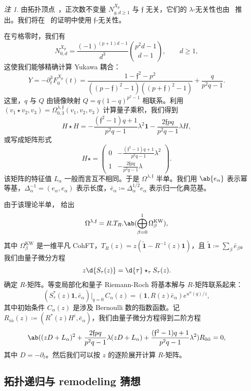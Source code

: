 \documentclass{amsart}
\theoremstyle{definition}
\theoremstyle{remark}
\newtheorem{rmk}[thm]{注}
\theoremstyle{plain}
\theoremstyle{definition}
\theoremstyle{remark}
\newcommand{\mf}[1]{\mathfrak{#1}}
\newcommand{\mr}[1]{\mathrm{#1}}
\newcommand{\wt}[1]{\widetilde{#1}}
\newcommand{\1}{\mathbf{1}}
\newcommand{\2}{\mathbf{2}}
\newcommand{\3}{\mathbf{3}}
\begin{document}
\begin{rmk}
    由拓扑顶点~\cite{LLLZ2009}，正次数不变量 \(N^{X_p}_{g,d\geq1}\) 与 \(\mf{f}\) 无关，它们的 \(\lambda\)-无关性也由~ 推出。我们将在~ 的证明中使用 \(\mf{f}\)-无关性。
\end{rmk}

在亏格零时，我们有
\[ N^{X_p}_{0,d} = \frac{(-1)^{(p+1)d-1}}{d^3}\binom{p^2d-1}{d-1}, \qquad d \geq 1, \]
这使我们能够精确计算 Yukawa 耦合：
\[ Y = -\partial_t^3 F_0^{X_p}(t) = \frac{1-\mf{f}^2-p^2}{((p-\mf{f})^2-1)((p+\mf{f})^2-1)} + \frac{q}{p^2q-1}. \]
这里，\(q\) 与 \(Q\) 由镜像映射 \(Q = q(1-q)^{p^2-1}\) 相联系。利用 \((v_1 \star v_2, v_3) = \Omega^{\lambda,\mf{f}}_{0,3}(v_1,v_2,v_3)\) 计算量子乘积，我们得到
\[ H \star H = -\frac{(\mf{f}^2-1)q+1}{p^2q-1}\lambda^2 \1 - \frac{2\mf{f}pq}{p^2q-1}\lambda H, \]
或写成矩阵形式
\[ H \star = \begin{pmatrix} 0 & -\frac{(\mf{f}^2-1)q+1}{p^2q-1}\lambda^2 \\ 1 & -\frac{2\mf{f}pq}{p^2q-1}\lambda \end{pmatrix}. \]
该矩阵的特征值 \(L_{\alpha}\) 一般而言互不相同。于是 \(\Omega^{\lambda,\mf{f}}\) 半单。我们用 \(\ab\{e_{\alpha}\}\) 表示幂等基，\(\Delta_{\alpha}^{-1} = (e_{\alpha},e_{\alpha})\) 表示长度，\(\bar{e}_{\alpha} \coloneqq \Delta_{\alpha}^{1/2}e_{\alpha}\) 表示归一化典范基。

由于该理论半单， 给出
\[ \Omega^{\lambda,\mf{f}} = R.T_R.\ab(\bigoplus_{\beta=0}^1 \Omega^{\mr{KW}}_{\beta}), \]
其中 \(\Omega^{\mr{KW}}_{\beta}\) 是一维平凡 CohFT，\(T_R(z) = z(\wt{\1}-R^{-1}(z)\1)\)，且 \(\wt{\1} \coloneqq \sum_{\beta}\bar{e}_{\beta}\)。我们由量子微分方程
\[ z \d{S_{\tau}(z)} = \d{\tau} \star_{\tau} S_{\tau}(z). \]
确定 \(R\)-矩阵。等变局部化和量子 Riemann-Roch 将基本解与 \(R\)-矩阵联系起来：
\[ (S^*_{\tau}(z)\1, \bar{e}_{\alpha})\big|_{q=0}\, C_{\alpha}(z) = (\1, R(z)\bar{e}_{\alpha})e^{u^{\alpha}(q)/z}, \]
其中初始条件 \(C_{\alpha}(z)\) 是涉及 Bernoulli 数的指数函数。记 \(R_{i\bar{\alpha}}(z) \coloneqq (R^*(z)H^i, \bar{e}_{\alpha})\)，我们由量子微分方程得到二阶方程
\[ \ab( (zD+L_{\alpha})^2 + \frac{2\mf{f}pq}{p^2q-1}\lambda(zD+L_{\alpha}) + \frac{(\mf{f}^2-1)q+1}{p^2q-1}\lambda^2 )R_{0\bar{\alpha}} = 0, \]
其中 \(D = -\partial_t\)。然后我们可以按 \(z\) 的逐阶展开计算 \(R\)-矩阵。

\subsection{拓扑递归与 remodeling 猜想}%
\label{sub:Topological recursion and the remodeling conjecture}
\end{document}
